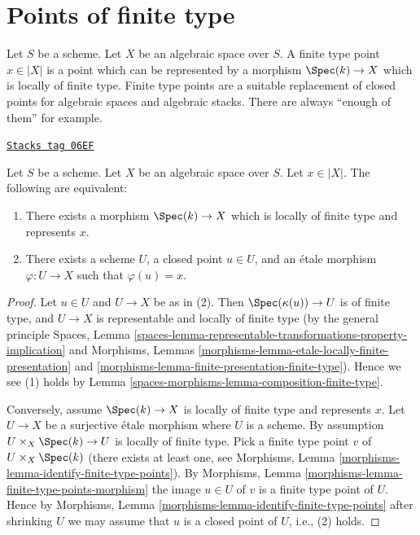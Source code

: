 \section{Points of finite type}
\label{spaces-morphisms-section-points-finite-type}
Let $S$ be a scheme. Let $X$ be an algebraic space over $S$.
A finite type point $x \in |X|$ is a point which can be represented by
a morphism $\Spec(k) \to X$ which is locally of finite type.
Finite type points are a suitable replacement of closed points for algebraic
spaces and algebraic stacks. There are always ``enough of them'' for example.

\begin{lemma}
\label{spaces-morphisms-lemma-point-finite-type}
\href{https://stacks.math.columbia.edu/tag/06EF}{\texttt{Stacks tag 06EF}}

Let $S$ be a scheme. Let $X$ be an algebraic space over $S$.
Let $x \in |X|$. The following are equivalent:
\begin{enumerate}
\item There exists a morphism $\Spec(k) \to X$
which is locally of finite type and represents $x$.
\item There exists a scheme $U$, a closed point $u \in U$, and an \'etale
morphism $\varphi : U \to X$ such that $\varphi(u) = x$.
\end{enumerate}
\end{lemma}

\begin{proof}
Let $u \in U$ and $U \to X$ be as in (2). Then
$\Spec(\kappa(u)) \to U$ is of finite type, and $U \to X$ is
representable and locally of finite type (by the general principle
Spaces, Lemma
\ref{spaces-lemma-representable-transformations-property-implication}
and
Morphisms, Lemmas \ref{morphisms-lemma-etale-locally-finite-presentation} and
\ref{morphisms-lemma-finite-presentation-finite-type}). Hence we see
(1) holds by
Lemma \ref{spaces-morphisms-lemma-composition-finite-type}.

\medskip\noindent
Conversely, assume $\Spec(k) \to X$ is locally of finite type and
represents $x$. Let $U \to X$ be a surjective \'etale morphism where $U$
is a scheme. By assumption $U \times_X \Spec(k) \to U$ is locally
of finite type. Pick a finite type point $v$ of
$U \times_X \Spec(k)$ (there exists at least one, see
Morphisms, Lemma \ref{morphisms-lemma-identify-finite-type-points}).
By
Morphisms, Lemma \ref{morphisms-lemma-finite-type-points-morphism}
the image $u \in U$ of $v$ is a finite type point of $U$.
Hence by
Morphisms, Lemma \ref{morphisms-lemma-identify-finite-type-points}
after shrinking $U$ we may assume that $u$ is a closed point of $U$, i.e.,
(2) holds.
\end{proof}

